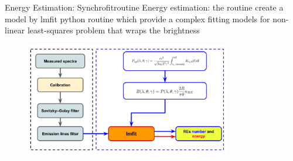 \documentclass{beamer}
\begin{document}
\begin{frame}[t]{Energy Estimation: Synchrofitroutine}
    \scriptsize
    Energy estimation: the routine create a model by lmfit python routine which provide a complex fitting models for non-linear least-squares problem that wraps the brightness
    \begin{figure}
    
    	\begin{center}
    		\includegraphics[width=0.8\textwidth]{drive/sychrofitRoutine.png}
    	\end{center}
    \end{figure}
    
\end{frame}
\end{document}
